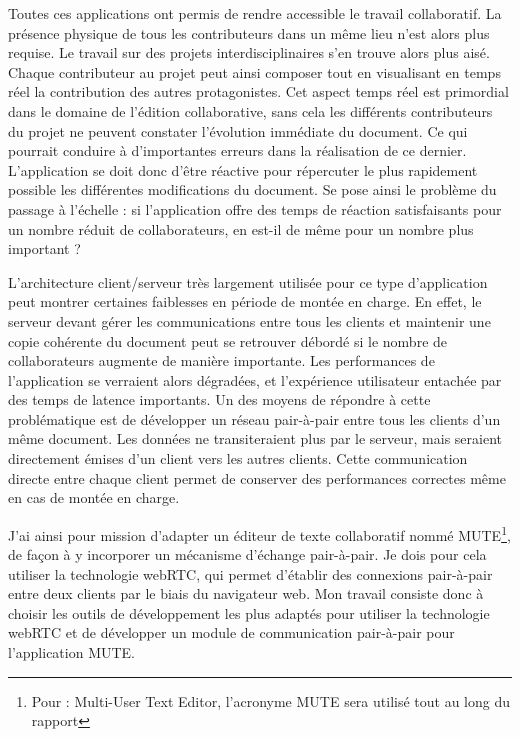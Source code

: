 \documentclass{tnreport}
\begin{document}
Toutes ces applications ont permis de rendre accessible le travail collaboratif. La présence physique de tous les contributeurs dans 
un même lieu n'est alors plus requise. Le travail sur des projets interdisciplinaires s'en trouve alors plus aisé. Chaque contributeur 
au projet peut ainsi composer tout en visualisant en temps réel la contribution des autres protagonistes. Cet aspect temps réel est 
primordial dans le domaine de l'édition collaborative, sans cela les différents contributeurs du projet ne peuvent constater 
l'évolution immédiate du document. Ce qui pourrait conduire à d'importantes erreurs dans la réalisation de ce dernier. L'application se doit donc d'être réactive pour répercuter le plus rapidement possible les différentes modifications du document. Se pose ainsi le 
problème du passage à l'échelle : si l'application offre des temps de réaction satisfaisants pour un nombre réduit de collaborateurs, 
en est-il de même pour un nombre plus important ? 

L'architecture client/serveur très largement utilisée pour ce type d'application peut montrer certaines faiblesses en période de 
montée en charge. En effet, le serveur devant gérer les communications entre tous les clients et maintenir une copie cohérente du 
document peut se retrouver débordé si le nombre de collaborateurs augmente de manière importante. Les performances de l'application se 
verraient alors dégradées, et l'expérience utilisateur entachée par des temps de latence importants. Un des moyens de répondre à cette 
problématique est de développer un réseau pair-à-pair entre tous les clients d'un même document. Les données ne transiteraient plus 
par le serveur, mais seraient directement émises d'un client vers les autres clients. Cette communication directe entre chaque client 
permet de conserver des performances correctes même en cas de montée en charge. 

J'ai ainsi pour mission d'adapter un éditeur de texte collaboratif nommé MUTE\footnote{Pour : Multi-User Text Editor, l'acronyme MUTE sera utilisé tout au long du rapport}, de façon à y incorporer un mécanisme d'échange pair-à-pair. Je dois pour cela utiliser la technologie webRTC, qui permet d'établir des connexions pair-à-pair entre deux clients par le biais du navigateur web. Mon travail consiste donc à choisir les outils de développement les 
plus adaptés pour utiliser la technologie webRTC et de développer un module de communication pair-à-pair pour l'application MUTE. 


\cleardoublepage
\end{document}

